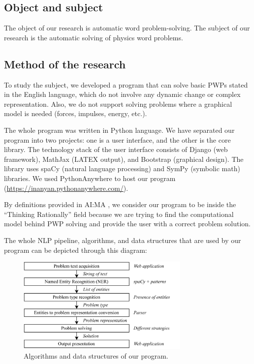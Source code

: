 \documentclass[a4paper, 12pt]{article}
\begin{document}
	\subsection{Object and subject}
	
	The object of our research is automatic word problem-solving. The
	subject of our research is the automatic solving of physics word
	problems.
	
	\subsection{Method of the research}
	
	To study the subject, we developed a program that can solve basic PWPs
	stated in the English language, which do not involve any dynamic change
	or complex representation. Also, we do not support solving problems
	where a graphical model is needed (forces, impulses, energy, etc.).
	
	The whole program was written in Python language. We have separated our
	program into two projects: one is a user interface, and the other is the
	core library. The technology stack of the user interface consists of
	Django (web framework), MathJax (LATEX output), and Bootstrap (graphical
	design). The library uses spaCy (natural language processing) and SymPy
	(symbolic math) libraries. We used PythonAnywhere to host our program
	(\url{https://inanyan.pythonanywhere.com/}).
	
	By definitions provided in AI:MA \cite{aima}, we consider our program to be
	inside the \enquote{Thinking Rationally} field because we are trying to find
	the computational model behind PWP solving and provide the user with a
	correct problem solution.
	
	The whole NLP pipeline, algorithms, and data structures that are used by
	our program can be depicted through this diagram:
	
	\begin{figure}[h]
		\centering
		\includegraphics[width=0.75\textwidth]{media/image2.png}
		\caption{Algorithms and data structures of our program.}
	\end{figure}
	
\end{document}
